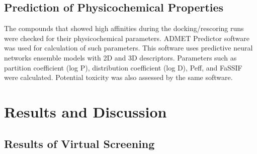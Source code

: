 \documentclass[11pt]{report}
\begin{document}
\subsection{Prediction of Physicochemical Properties}
\label{ss:VS-Methods_physico}

The compounds that showed high affinities during the docking/rescoring runs were checked for their physicochemical parameters. ADMET Predictor software
\cite{ADMET} 
was used for calculation of such parameters. This software
uses predictive neural networks ensemble
models with 2D and 3D descriptors. Parameters such as partition coefficient (log P), distribution
coefficient (log D), \gls{Peff}, and \gls{FaSSIF} were calculated. Potential toxicity was also assessed by the same software.

\section{Results and Discussion}
\label{s:VS-Results}

\subsection{Results of Virtual Screening}
\label{ss:VS-Results_VS}
\end{document}

